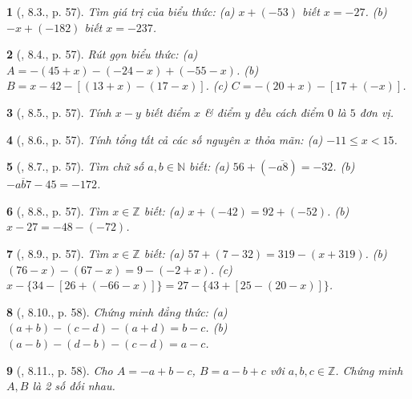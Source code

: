 \documentclass{article}
\newtheorem{baitoan}{}
\begin{document}
\begin{baitoan}[\cite{Binh_boi_duong_Toan_6_tap_1}, 8.3., p. 57]
	Tìm giá trị của biểu thức: (a) $x + (-53)$ biết $x = -27$. (b) $-x + (-182)$ biết $x = -237$.
\end{baitoan}

\begin{baitoan}[\cite{Binh_boi_duong_Toan_6_tap_1}, 8.4., p. 57]
	Rút gọn biểu thức: (a) $A = -(45 + x) - (-24 - x) + (-55 - x)$. (b) $B = x - 42 - [(13 + x) - (17 - x)]$. (c) $C = -(20 + x) - [17 + (-x)]$.
\end{baitoan}

\begin{baitoan}[\cite{Binh_boi_duong_Toan_6_tap_1}, 8.5., p. 57]
	Tính $x - y$ biết điểm $x$ \& điểm $y$ đều cách điểm $0$ là $5$ đơn vị.
\end{baitoan}

\begin{baitoan}[\cite{Binh_boi_duong_Toan_6_tap_1}, 8.6., p. 57]
	Tính tổng tất cả các số nguyên $x$ thỏa mãn: (a) $-11\le x < 15$.
\end{baitoan}

\begin{baitoan}[\cite{Binh_boi_duong_Toan_6_tap_1}, 8.7., p. 57]
	Tìm chữ số $a,b\in\mathbb{N}$ biết: (a) $56 + (-\overline{a8}) = -32$. (b) $-\overline{ab7} - 45 = -172$.
\end{baitoan}

\begin{baitoan}[\cite{Binh_boi_duong_Toan_6_tap_1}, 8.8., p. 57]
	Tìm $x\in\mathbb{Z}$ biết: (a) $x + (-42) = 92 + (-52)$. (b) $x - 27 = -48 - (-72)$.
\end{baitoan}

\begin{baitoan}[\cite{Binh_boi_duong_Toan_6_tap_1}, 8.9., p. 57]
	Tìm $x\in\mathbb{Z}$ biết: (a) $57 + (7 - 32) = 319 - (x + 319)$. (b) $(76 - x) - (67 - x) = 9 - (-2 + x)$. (c) $x - \{34 - [26 + (-66 - x)]\} = 27 - \{43 + [25 - (20 - x)]\}$.
\end{baitoan}

\begin{baitoan}[\cite{Binh_boi_duong_Toan_6_tap_1}, 8.10., p. 58]
	Chứng minh đẳng thức: (a) $(a + b) - (c - d) - (a + d) = b - c$. (b) $(a - b) - (d - b) - (c - d) = a - c$.
\end{baitoan}

\begin{baitoan}[\cite{Binh_boi_duong_Toan_6_tap_1}, 8.11., p. 58]
	Cho $A = -a + b - c$, $B = a - b + c$ với $a,b,c\in\mathbb{Z}$. Chứng minh $A,B$ là 2 số đối nhau.
\end{baitoan}
\end{document}
